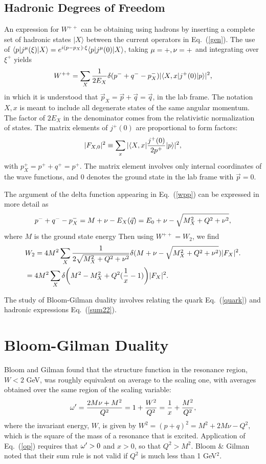 \documentclass[aps,prd,amsmath,longbibliography]{revtex4-1}
\newcommand{\eq}[1]{Eq.~(\ref{#1})}
\def\bea{\begin{eqnarray}}
\def\eea{\end{eqnarray}}\def\a{\alpha}\newcommand{\bfk}{{\bf k}}\newcommand{\bfq}{{\bf q}}
\def\la{\langle}\def\ra{\rangle}\def\d{\delta}\def\bfr{{\bf r}}\def\k{\kappa}\def\G{\Gamma}\def\z{\zeta}\def\b{\beta}
\begin{document}
{\subsection{Hadronic Degrees of Freedom}
 
An expression for $W^{++}$ can be obtaining using hadrons by 
 inserting a complete set of hadronic states $|X\ra$ between the current operators in \eq{gen}. %
 The use of $\la p|j^\m(\xi)|X\ra=e^{i (p-p_X)\cdot \xi}\la p|j^\m(0)|X\ra$, taking $\mu=+,\nu=+$  and integrating  over $\xi^+$ yields
\bea W^{++}=  \sum_X{1\over 2E_X} \d(p^-+q^--p_X^-)|\la X,x|j^+(0)|p\ra|^2,\label{wpp}\eea
in which it is understood that $\vec p_X=\vec p+\vec q=\vec q$, in the lab frame.  The notation $X,x$ is meant to include all degenerate states of the same angular momentum.
The factor of $2E_X$ in the denominator comes from the relativistic normalization of states.
The matrix elements of $j^+(0)$ are proportional to form factors:
\bea|F_{X,0}|^2\equiv \sum_{x}|\la X,x|{j^+(0)\over 2p^+} |p\ra|^2,\label{f0}\eea
with $p_X^+=p^++q^+=p^+$. The matrix element involves only internal coordinates of the wave functions,  and 0 denotes  the ground state in the lab frame with $\vec p=0$. 


The argument of the delta function appearing in \eq{wpp} can be expressed in more detail
as \bea p^-+q^--p_X^-= M+\n-E_X(\vec q)= E_0+\n -\sqrt{M_X^2+Q^2+\n^2},\eea
where $M$ is the ground state energy
Then using $W^{++}=W_2$, we find
\bea &W_2=4M^2\sum_{X}{1\over 2\sqrt{M_{X}^2+Q^2+\n^2}} \d (M+\n -\sqrt{M_{X}^2+Q^2+\n^2}) |F_{X}|^2.\label{sum21}\\&
=4M^2\sum_{X}\d\bigg(M^2-M_X^2+Q^2({1\over x}-1)\bigg)|F_{X}|^2.\label{sum22}\eea

The study of Bloom-Gilman duality involves relating the quark \eq{quark} and hadronic expressions \eq{sum22}.
\section{Bloom-Gilman Duality}

Bloom and Gilman found that  the structure function in the resonance region, $W<2 $ GeV, was roughly equivalent on average to the scaling one, with averages obtained over the same region of the scaling variable:
\bea \o'={2M \nu +M^2\over Q^2}=1+{W^2\over Q^2} ={1\over x}+{M^2\over Q^2},\label{op}
\eea
where the invariant energy, $W$,
is given by
$ W^2=(p+q)^2=M^2 +2M\nu -Q^2,$
which is the square of the mass of a resonance that is excited. Application of \eq{op} requires that $\omega'>0$ and $x>0$, so that
$Q^2>M^2$. Bloom \& Gilman noted that their sum rule is not valid if $Q^2$ is much less than 1 GeV$^2$.

}
\end{document}
